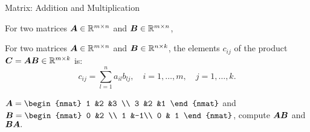 \documentclass[handout,fleqn,aspectratio=169]{beamer}
\begin{document}
\begin{frame}{Matrix: Addition and Multiplication}

\plitemsep 0.1in

\bci 
\item For two matrices $\bm{A} \in {\mathbb R}^{m \times n}$ and $\bm{B} \in {\mathbb R}^{m \times n}$, 

\item For two matrices $\bm{A} \in {\mathbb R}^{m \times n}$ and $\bm{B} \in {\mathbb R}^{n \times k}$, 
the elements $c_{ij}$ of the product $\bm{C} = \bm{A}\bm{B} \in {\mathbb R}^{m \times k}$ is:
$$
c_{ij} = \sum_{l=1}^n a_{il} b_{lj}, \quad i = 1, \ldots, m, \quad j = 1, \ldots, k.
$$

\item \exam 
$\mat{A} = 
\begin{nmat} 
 1 &2 &3 \\
 3  &2  &1
\end{nmat}
$ and 
$\mat{B} = 
\begin{nmat} 
 0 &2 \\
 1  &-1\\
 0  & 1
\end{nmat}
$, compute $\bm{AB}$ and $\bm{BA}.$
\eci
\end{frame}
\end{document}
